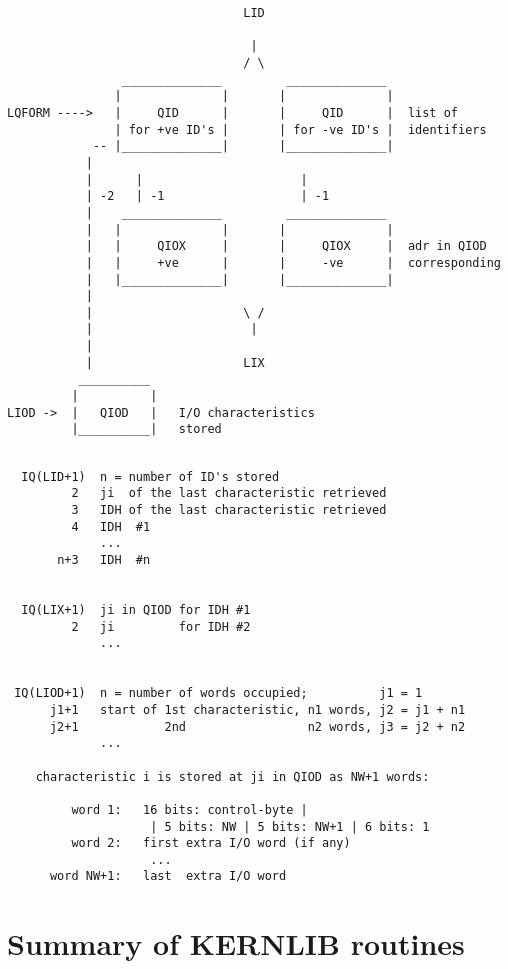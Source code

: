 \begin{verbatim}
                                 LID

                                  |
                                 / \
                ______________         ______________
               |              |       |              |
LQFORM ---->   |     QID      |       |     QID      |  list of
               | for +ve ID's |       | for -ve ID's |  identifiers
            -- |______________|       |______________|
           |
           |      |                      |
           | -2   | -1                   | -1
           |    ______________         ______________
           |   |              |       |              |
           |   |     QIOX     |       |     QIOX     |  adr in QIOD
           |   |     +ve      |       |     -ve      |  corresponding
           |   |______________|       |______________|
           |
           |                     \ /
           |                      |
           |
           |                     LIX
          __________
         |          |
LIOD ->  |   QIOD   |   I/O characteristics
         |__________|   stored
\end{verbatim} 
\begin{verbatim}

  IQ(LID+1)  n = number of ID's stored
         2   ji  of the last characteristic retrieved
         3   IDH of the last characteristic retrieved
         4   IDH  #1
             ...
       n+3   IDH  #n


  IQ(LIX+1)  ji in QIOD for IDH #1
         2   ji         for IDH #2
             ...


 IQ(LIOD+1)  n = number of words occupied;          j1 = 1
      j1+1   start of 1st characteristic, n1 words, j2 = j1 + n1
      j2+1            2nd                 n2 words, j3 = j2 + n2
             ...

    characteristic i is stored at ji in QIOD as NW+1 words:

         word 1:   16 bits: control-byte |
                    | 5 bits: NW | 5 bits: NW+1 | 6 bits: 1
         word 2:   first extra I/O word (if any)
                    ...
      word NW+1:   last  extra I/O word
\end{verbatim} 

\chapter{Summary of KERNLIB routines}

